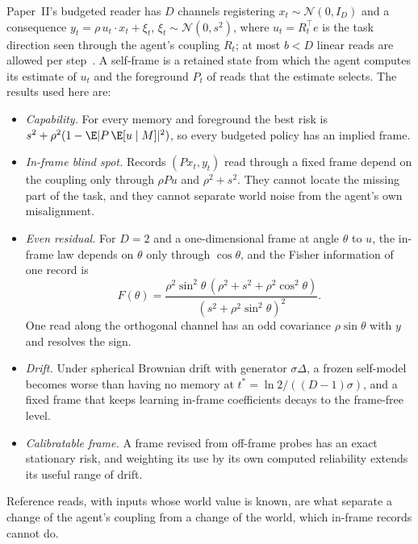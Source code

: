 Paper~II's budgeted reader has $D$ channels registering $x_t\sim\mathcal N(0,I_D)$ and a consequence $y_t=\rho\,u_t\cdot x_t+\xi_t$, $\xi_t\sim\mathcal N(0,s^2)$, where $u_t=R_t^{\top}e$ is the task direction seen through the agent's coupling $R_t$; at most $b<D$ linear reads are allowed per step~\cite{Liu2026TDOME_II}. A self-frame is a retained state from which the agent computes its estimate of $u_t$ and the foreground $P_t$ of reads that the estimate selects. The results used here are:
\begin{itemize}
\item \emph{Capability.} For every memory and foreground the best risk is $s^2+\rho^2(1-\E|P\,\E[u\mid M]|^2)$, so every budgeted policy has an implied frame.
\item \emph{In-frame blind spot.} Records $(Px_t,y_t)$ read through a fixed frame depend on the coupling only through $\rho Pu$ and $\rho^2+s^2$. They cannot locate the missing part of the task, and they cannot separate world noise from the agent's own misalignment.
\item \emph{Even residual.} For $D=2$ and a one-dimensional frame at angle $\theta$ to $u$, the in-frame law depends on $\theta$ only through $\cos\theta$, and the Fisher information of one record is
\begin{equation}
\label{eq:fisher_even_II}
F(\theta)=\frac{\rho^2\sin^2\theta\,(\rho^2+s^2+\rho^2\cos^2\theta)}{(s^2+\rho^2\sin^2\theta)^2}.
\end{equation}
One read along the orthogonal channel has an odd covariance $\rho\sin\theta$ with $y$ and resolves the sign.
\item \emph{Drift.} Under spherical Brownian drift with generator $\sigma\Delta$, a frozen self-model becomes worse than having no memory at $t^*=\ln2/((D-1)\sigma)$, and a fixed frame that keeps learning in-frame coefficients decays to the frame-free level.
\item \emph{Calibratable frame.} A frame revised from off-frame probes has an exact stationary risk, and weighting its use by its own computed reliability extends its useful range of drift.
\end{itemize}
Reference reads, with inputs whose world value is known, are what separate a change of the agent's coupling from a change of the world, which in-frame records cannot do.
